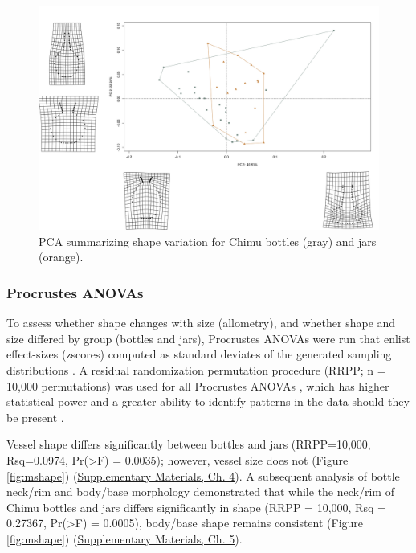 \documentclass[]{interact}
\theoremstyle{plain}%
\theoremstyle{definition}
\theoremstyle{remark}
\begin{document}
\begin{figure}\centering
\includegraphics[width=\linewidth]{figs/pca-warp-botjar.jpg}
\caption{PCA summarizing shape variation for Chimu bottles (gray) and jars (orange). }
\label{fig:pca}
\end{figure}

\hypertarget{procrustes-anovas}{%
\subsubsection{Procrustes ANOVAs}\label{procrustes-anovas}}

To assess whether shape changes with size (allometry), and whether shape
and size differed by group (bottles and jars), Procrustes ANOVAs
\citep{RN1749} were run that enlist effect-sizes (zscores) computed as
standard deviates of the generated sampling distributions
\citep{RN1756}. A residual randomization permutation procedure (RRPP; n
= 10,000 permutations) was used for all Procrustes ANOVAs
\citep{RN1655,RN11775}, which has higher statistical power and a greater
ability to identify patterns in the data should they be present
\citep{RN1719}.

Vessel shape differs significantly between bottles and jars
(RRPP=10,000, Rsq=0.0974, Pr(\textgreater F) = 0.0035); however, vessel
size does not (Figure \ref{fig:mshape})
(\href{https://seldenlab.github.io/peru.bottle.jar/}{Supplementary
Materials, Ch. 4}). A subsequent analysis of bottle neck/rim and
body/base morphology demonstrated that while the neck/rim of Chimu
bottles and jars differs significantly in shape (RRPP = 10,000, Rsq =
0.27367, Pr(\textgreater F) = 0.0005), body/base shape remains
consistent (Figure \ref{fig:mshape})
(\href{https://seldenlab.github.io/peru.bottle.jar/}{Supplementary
Materials, Ch. 5}).
\end{document}
